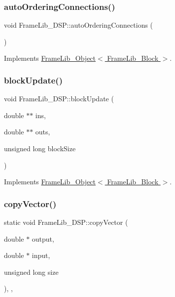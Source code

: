 \subsubsection{\texorpdfstring{auto\+Ordering\+Connections()}{autoOrderingConnections()}}
{\footnotesize\ttfamily void Frame\+Lib\+\_\+\+D\+S\+P\+::auto\+Ordering\+Connections (\begin{DoxyParamCaption}{ }\end{DoxyParamCaption})\hspace{0.3cm}{\ttfamily [virtual]}}



Implements \hyperlink{class_frame_lib___object_afa5bb93302a641c23b5eac7ab0dfe516}{Frame\+Lib\+\_\+\+Object$<$ Frame\+Lib\+\_\+\+Block $>$}.

\mbox{\label{class_frame_lib___d_s_p_aafa57c93417ced3d5610ca9f6b0f0913}} 
\subsubsection{\texorpdfstring{block\+Update()}{blockUpdate()}}
{\footnotesize\ttfamily void Frame\+Lib\+\_\+\+D\+S\+P\+::block\+Update (\begin{DoxyParamCaption}\item[{double $\ast$$\ast$}]{ins,  }\item[{double $\ast$$\ast$}]{outs,  }\item[{unsigned long}]{block\+Size }\end{DoxyParamCaption})\hspace{0.3cm}{\ttfamily [virtual]}}



Implements \hyperlink{class_frame_lib___object_a6efd81ab386e62400960471fa3cc94e7}{Frame\+Lib\+\_\+\+Object$<$ Frame\+Lib\+\_\+\+Block $>$}.

\mbox{\label{class_frame_lib___d_s_p_aaa7b3e5f55db4a6cf13d37958f08b17f}} 
\subsubsection{\texorpdfstring{copy\+Vector()}{copyVector()}}
{\footnotesize\ttfamily static void Frame\+Lib\+\_\+\+D\+S\+P\+::copy\+Vector (\begin{DoxyParamCaption}\item[{double $\ast$}]{output,  }\item[{double $\ast$}]{input,  }\item[{unsigned long}]{size }\end{DoxyParamCaption})\hspace{0.3cm}{\ttfamily [inline]}, {\ttfamily [static]}, {\ttfamily [protected]}}

